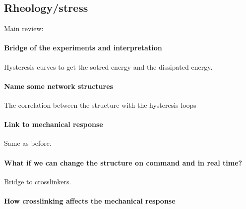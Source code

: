 \subsection{Rheology/stress}\label{ch1:NetworkStructure}

Main review:\citep{guPolymerNetworksPlastics2020,sheikoArchitecturalCodeRubber2019}

\paragraph{Bridge of the experiments and interpretation} Hysteresis curves to get the sotred energy and the dissipated energy.

\paragraph{Name some network structures} The correlation between the structure with the hysteresis loops

\paragraph{Link to mechanical response} Same as before.


\paragraph{What if we can change the structure on command and in real time?} Bridge to crosslinkers.

\paragraph{How crosslinking affects the mechanical response}

